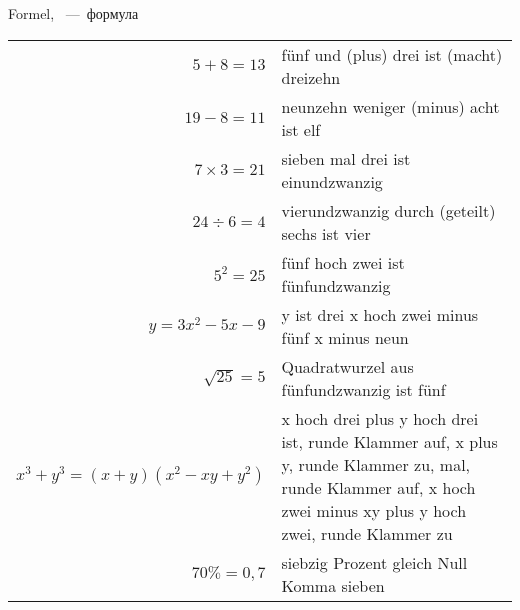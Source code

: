 
 Formel, ~---~формула

\begin{tabular}{rp{7cm}}
$5 + 8 = 13$ & f\"unf und (plus) drei ist (macht) dreizehn \\
$19 - 8 = 11$ & neunzehn weniger (minus) acht ist elf \\
$7 \times 3 = 21$ & sieben mal drei ist einundzwanzig \\
$24 \div 6 = 4$ & vierundzwanzig durch (geteilt) sechs ist vier \\
$5^2 = 25$ & f\"unf hoch zwei ist fünfundzwanzig \\
$y = 3x^2 - 5x - 9$ & y ist drei x hoch zwei minus f\"unf x minus neun \\
$\sqrt{25} = 5$ & Quadratwurzel aus f\"unfundzwanzig ist f\"unf \\
$x^3 + y^3 = (x + y)(x^2 - xy + y^2)$ & x hoch drei plus y hoch drei ist, runde Klammer auf, x plus y, runde Klammer zu, mal, runde Klammer auf, x hoch zwei minus xy plus y hoch zwei, runde Klammer zu \\
$70\% = 0,7$ & siebzig Prozent gleich Null Komma sieben
\end{tabular}
